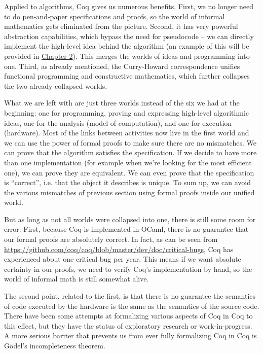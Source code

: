 \documentclass[declaration,mgr,english,shortabstract]{iithesis}
\begin{document}
Applied to algorithms, Coq gives us numerous benefits. First, we no longer need to do pen-and-paper specifications and proofs, so the world of informal mathematics gets eliminated from the picture. Second, it has very powerful abstraction capabilities, which bypass the need for pseudocode -- we can directly implement the high-level idea behind the algorithm (an example of this will be provided in \hyperref[ch2]{Chapter 2}). This merges the worlds of ideas and programming into one. Third, as already mentioned, the Curry-Howard correspondence unifies functional programming and constructive mathematics, which further collapses the two already-collapsed worlds.

What we are left with are just three worlds instead of the six we had at the beginning: one for programming, proving and expressing high-level algorithmic ideas, one for the analysis (model of computation), and one for execution (hardware). Most of the links between activities now live in the first world and we can use the power of formal proofs to make sure there are no mismatches. We can prove that the algorithm satisfies the specification. If we decide to have more than one implementation (for example when we're looking for the most efficient one), we can prove they are equivalent. We can even prove that the specification is ``correct'', i.e. that the object it describes is unique. To sum up, we can avoid the various mismatches of previous section using formal proofs inside our unified world.

But as long as not all worlds were collapsed into one, there is still some room for error. First, because Coq is implemented in OCaml, there is no guarantee that our formal proofs are absolutely correct. In fact, as can be seen from \url{https://github.com/coq/coq/blob/master/dev/doc/critical-bugs}, Coq has experienced about one critical bug per year. This means if we want absolute certainty in our proofs, we need to verify Coq's implementation by hand, so the world of informal math is still somewhat alive.

The second point, related to the first, is that there is no guarantee the semantics of code executed by the hardware is the same as the semantics of the source code. There have been some attempts at formalizing various aspects of Coq in Coq \cite{CoqInCoq} \cite{CoqCoqCorrect} to this effect, but they have the status of exploratory research or work-in-progress. A more serious barrier that prevents us from ever fully formalizing Coq in Coq is G\"{o}del's incompleteness theorem.
\end{document}
